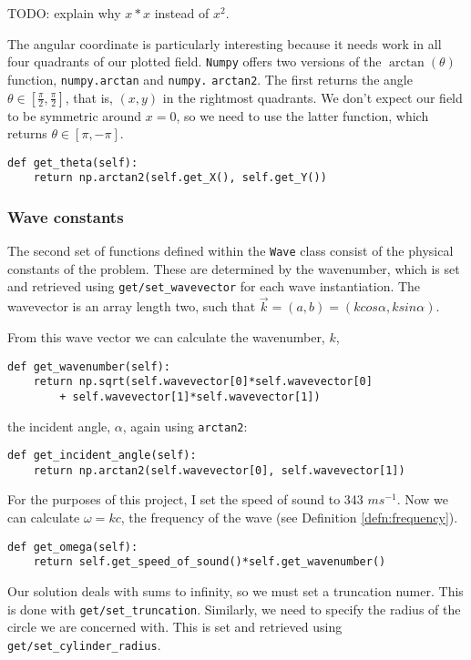 %
TODO: explain why $x*x$ instead of $x^2$.\par
%
The angular coordinate is particularly interesting because it needs work in all four quadrants of our plotted field. \verb!Numpy! offers two versions of the $\arctan(\theta)$ function, \verb!numpy.arctan! and \verb!numpy.! \verb!arctan2!. The first returns the angle $\theta \in [\frac{\pi}{2},\frac{\pi}{2}]$, that is, $(x, y)$ in the rightmost quadrants. We don't expect our field to be symmetric around $x=0$, so we need to use the latter function, which returns $\theta \in [\pi, -\pi]$.
%
  \begin{lstlisting}
def get_theta(self):
    return np.arctan2(self.get_X(), self.get_Y())\end{lstlisting}\par
%
\subsubsection{Wave constants}
%
The second set of functions defined within the \verb!Wave! class consist of the physical constants of the problem. These are determined by the wavenumber, which is set and retrieved using \verb!get/set_wavevector! for each wave instantiation. The wavevector is an array length two, such that $\vec{k} = (a,b) = (kcos\alpha, ksin\alpha)$.\par
%
From this wave vector we can calculate the wavenumber, $k$,
%
  \begin{lstlisting}
def get_wavenumber(self):
    return np.sqrt(self.wavevector[0]*self.wavevector[0]
        + self.wavevector[1]*self.wavevector[1])\end{lstlisting}
%
the incident angle, $\alpha$, again using \verb!arctan2!:
%
  \begin{lstlisting}
def get_incident_angle(self):
    return np.arctan2(self.wavevector[0], self.wavevector[1])\end{lstlisting}\par
%
For the purposes of this project, I set the speed of sound to 343 $ms^{-1}$. Now we can calculate $\omega = k c$, the frequency of the wave (see Definition \ref{defn:frequency}).
%
  \begin{lstlisting}
def get_omega(self):
    return self.get_speed_of_sound()*self.get_wavenumber()\end{lstlisting} \par
%
Our solution deals with sums to infinity, so we must set a truncation numer. This is done with \verb!get/set_truncation!. Similarly, we need to specify the radius of the circle we are concerned with. This is set and retrieved using \verb!get/set_cylinder_radius!.
%
